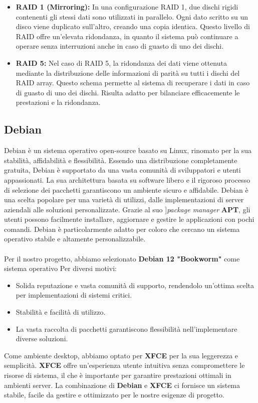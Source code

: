 \documentclass[11pt]{article}
\begin{document}
\begin{itemize}
    \item \textbf{RAID 1 (Mirroring):} In una configurazione RAID 1, due dischi rigidi contenenti gli stessi dati sono utilizzati in parallelo. Ogni dato scritto su un disco viene duplicato sull'altro, creando una copia identica. Questo livello di RAID offre un'elevata ridondanza, in quanto il sistema può continuare a operare senza interruzioni anche in caso di guasto di uno dei dischi.

    \item \textbf{RAID 5:} Nel caso di RAID 5, la ridondanza dei dati viene ottenuta mediante la distribuzione delle informazioni di parità su tutti i dischi del RAID array. Questo schema permette al sistema di recuperare i dati in caso di guasto di uno dei dischi. Risulta adatto per bilanciare efficacemente le prestazioni e la ridondanza.
\end{itemize}

\subsection{Debian}
Debian è un sistema operativo open-source basato su Linux, rinomato per la sua stabilità, affidabilità e flessibilità. Essendo una distribuzione completamente gratuita, Debian è supportato da una vasta comunità di sviluppatori e utenti appassionati. La sua architettura basata su software libero e il rigoroso processo di selezione dei pacchetti garantiscono un ambiente sicuro e affidabile. Debian è una scelta popolare per una varietà di utilizzi, dalle implementazioni di server aziendali alle soluzioni personalizzate. Grazie al suo ]\textit{package manager} \textbf{APT}, gli utenti possono facilmente installare, aggiornare e gestire le applicazioni con pochi comandi. Debian è particolarmente adatto per coloro che cercano un sistema operativo stabile e altamente personalizzabile.
\\\\
Per il nostro progetto, abbiamo selezionato \textbf{Debian 12 "Bookworm"} come sistema operativo Per diversi motivi:
\begin{itemize}
    \item Solida reputazione e vasta comunità di supporto, rendendolo un'ottima scelta per implementazioni di sistemi critici.
    \item Stabilità e facilità di utilizzo.
    \item La vasta raccolta di pacchetti garantiscono flessibilità nell'implementare diverse soluzioni.
\end{itemize}
Come ambiente desktop, abbiamo optato per \textbf{XFCE} per la sua leggerezza e semplicità. \textbf{XFCE} offre un'esperienza utente intuitiva senza compromettere le risorse di sistema, il che è importante per garantire prestazioni ottimali in ambienti server. La combinazione di \textbf{Debian} e \textbf{XFCE} ci fornisce un sistema stabile, facile da gestire e ottimizzato per le nostre esigenze di progetto.
\end{document}
